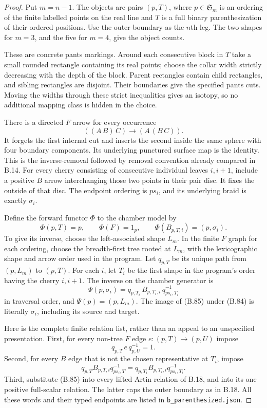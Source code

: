 \begin{proof}
Put $m=n-1$.  The objects are pairs $(p,T)$, where
$p\in\mathfrak S_m$ is an ordering of the finite labelled
points on the real line and $T$ is a full binary
parenthesization of their ordered positions.  Use the
outer boundary as the $n$th leg.  The two shapes for
$m=3$, and the five for $m=4$, give the object counts.

These are concrete pants markings.  Around each
consecutive block in $T$ take a small rounded rectangle
containing its real points; choose the collar width
strictly decreasing with the depth of the block.
Parent rectangles contain child rectangles, and sibling
rectangles are disjoint.  Their boundaries give the
specified pants cuts.  Moving the widths through these
strict inequalities gives an isotopy, so no additional
mapping class is hidden in the choice.

There is a directed $F$ arrow for every occurrence
\[
 ((A\,B)\,C)\longrightarrow(A\,(B\,C)).
\]
It forgets the first internal cut and inserts the second
inside the same sphere with four boundary components.
Its underlying punctured surface map is the identity.
This is the inverse-removal followed by removal convention
already compared in B.14.  For every cherry consisting
of consecutive individual leaves $i,i+1$, include a
positive $B$ arrow interchanging those two points in
their pair disc.  It fixes the outside of that disc.
The endpoint ordering is $ps_i$, and its underlying
braid is exactly $\sigma_i$.

Define the forward functor $\Phi$ to the chamber model
by
\[
 \Phi(p,T)=p,\qquad
 \Phi(F)=1_p,\qquad
 \Phi(B_{p,T,i})=(p,\sigma_i).                    \tag{B.84}
\]
To give its inverse, choose the left-associated shape
$L_m$.  In the finite $F$ graph for each ordering,
choose the breadth-first tree rooted at $L_m$, with
the lexicographic shape and arrow order used in the
program.  Let $q_{p,T}$ be its unique path from
$(p,L_m)$ to $(p,T)$.  For each $i$, let $T_i$ be the
first shape in the program's order having the cherry
$i,i+1$.  The inverse on the chamber generator is
\[
 \Psi(p,\sigma_i)=
 q_{p,T_i}\, B_{p,T_i,i}\,q_{ps_i,T_i}^{-1}
                                                               \tag{B.85}
\]
in traversal order, and $\Psi(p)=(p,L_m)$.
The image of (B.85) under (B.84) is literally $\sigma_i$,
including its source and target.

Here is the complete finite relation list, rather than
an appeal to an unspecified presentation.  First, for
every non-tree $F$ edge $e:(p,T)\to(p,U)$ impose
\[
 q_{p,T}\,e\,q_{p,U}^{-1}=1.
                                                               \tag{B.86}
\]
Second, for every $B$ edge that is not the chosen
representative at $T_i$, impose
\[
 q_{p,T} B_{p,T,i}q_{ps_i,T}^{-1}
   =q_{p,T_i}B_{p,T_i,i}q_{ps_i,T_i}^{-1}.
                                                               \tag{B.87}
\]
Third, substitute (B.85) into every lifted Artin
relation of B.18, and into its one positive full-scalar
relation.  The latter caps the outer boundary as in
B.18.  All these words and their typed endpoints are
listed in \texttt{b\_parenthesized.json}.


\end{proof}

